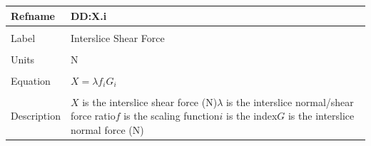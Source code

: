 \documentclass[12pt]{article}
\begin{document}
\noindent \begin{minipage}{\textwidth}
\begin{tabular}{p{} p{}}
\toprule \textbf{Refname} & \textbf{DD:X.i}
\label{DD:X.i}
\\ \midrule \\
Label & Interslice Shear Force
\\ \midrule \\
Units & N
\\ \midrule \\
Equation & $X=λ f_{i} G_{i}$
\\ \midrule \\
Description & $X$ is the interslice shear force (N)\newline$λ$ is the interslice normal/shear force ratio\newline$f$ is the scaling function\newline$i$ is the index\newline$G$ is the interslice normal force (N)
\\ \bottomrule \end{tabular}
\end{minipage}\\
~\newline
\end{document}
